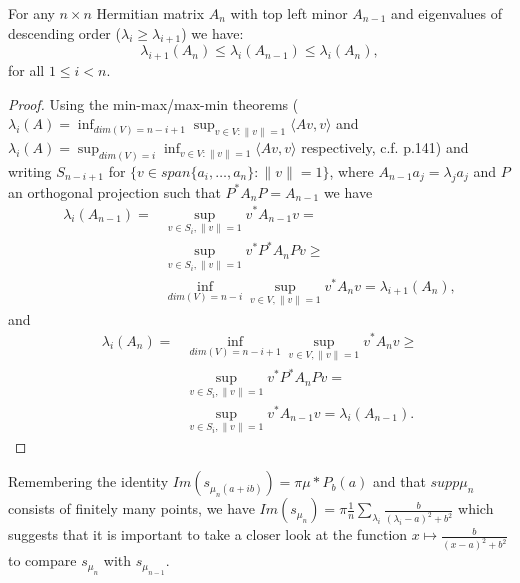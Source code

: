 \begin{theorem}
	For any $n\times n$ Hermitian matrix $A_n$ with top left minor $A_{n-1}$ and eigenvalues of descending order ($\lambda_i\geq\lambda_{i+1}$) we have:
	\begin{equation*}
		\lambda_{i+1}(A_n)\leq\lambda_i(A_{n-1})\leq\lambda_i(A_n), 
	\end{equation*}
	for all $1\leq i < n$.
\end{theorem}
\begin{proof}
Using the min-max/max-min theorems ($\lambda_i(A)=\inf_{dim(V)=n-i+1}\sup_{v\in V : \|v\|=1}\langle Av,v\rangle$ and $\lambda_i(A)=\sup_{dim(V)=i}\inf_{v\in V : \|v\|=1}\langle Av,v\rangle$ respectively, c.f. \cite{TeschlQM} p.141) and writing $S_{n-i+1}$ for $\{v\in span\{a_i,\dots,a_n\}: \|v\|=1\}$, where $A_{n-1}a_j=\lambda_j a_j$ and $P$ an orthogonal projection such that $P^*A_nP=A_{n-1}$ we have
	\begin{align*}
		\lambda_i(A_{n-1}) =
		&\sup_{v\in S_i,\|v\|=1}v^*A_{n-1}v =\\
		&\sup_{v\in S_i,\|v\|=1}v^*P^*A_nPv\geq\\
		&\inf_{dim(V)=n-i}\sup_{v\in V,\|v\|=1}v^*A_nv =
		\lambda_{i+1}(A_n),
	\end{align*}
	and
	\begin{align*}
		\lambda_i(A_n) =
		&\inf_{dim(V)=n-i+1}\sup_{v\in V,\|v\|=1}v^*A_nv \geq\\
		&\sup_{v\in S_i,\|v\|=1}v^*P^*A_nPv =\\
		&\sup_{v\in S_i,\|v\|=1}v^*A_{n-1}v =
		\lambda_i(A_{n-1}).%
	\end{align*}
\end{proof}

Remembering the identity $Im(s_{\mu_n(a+ib)})=\pi\mu*P_b(a)$ and that $supp\mu_n$ consists of finitely many points, we have $Im(s_{\mu_n})=\pi\frac{1}{n}\sum_{\lambda_i}\frac{b}{(\lambda_i-a)^2+b^2}$ which suggests that it is important to take a closer look at the function $x\mapsto\frac{b}{(x-a)^2+b^2}$ to compare $s_{\mu_n}$ with $s_{\mu_{n-1}}$.

